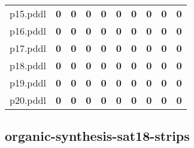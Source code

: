 \documentclass{article}
\begin{document}
\begin{tabular}{@{}lrrrrrrrrr@{}}
p15.pddl & \textbf{0} & \textbf{0} & \textbf{0} & \textbf{0} & \textbf{0} & \textbf{0} & \textbf{0} & \textbf{0} & \textbf{0} \\
p16.pddl & \textbf{0} & \textbf{0} & \textbf{0} & \textbf{0} & \textbf{0} & \textbf{0} & \textbf{0} & \textbf{0} & \textbf{0} \\
p17.pddl & \textbf{0} & \textbf{0} & \textbf{0} & \textbf{0} & \textbf{0} & \textbf{0} & \textbf{0} & \textbf{0} & \textbf{0} \\
p18.pddl & \textbf{0} & \textbf{0} & \textbf{0} & \textbf{0} & \textbf{0} & \textbf{0} & \textbf{0} & \textbf{0} & \textbf{0} \\
p19.pddl & \textbf{0} & \textbf{0} & \textbf{0} & \textbf{0} & \textbf{0} & \textbf{0} & \textbf{0} & \textbf{0} & \textbf{0} \\
p20.pddl & \textbf{0} & \textbf{0} & \textbf{0} & \textbf{0} & \textbf{0} & \textbf{0} & \textbf{0} & \textbf{0} & \textbf{0} \\
\end{tabular}

\hypertarget{coverage-organic-synthesis-sat18-strips}{}
\subsection*{organic-synthesis-sat18-strips}
\end{document}
